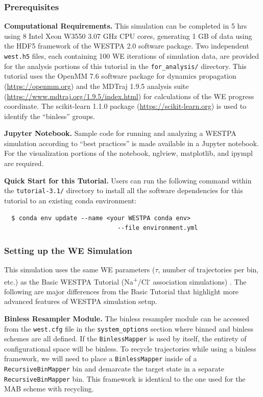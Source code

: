 \subsubsection{Prerequisites}

\textbf{Computational Requirements.} This simulation can be completed in 5 hrs using 8 Intel Xeon W3550 3.07 GHz CPU cores, generating 1 GB of data using the HDF5 framework of the WESTPA 2.0 software package. 
Two independent \verb|west.h5| files, each containing 100 WE iterations of simulation data, are provided for the analysis portions of this tutorial in the \verb|for_analysis/| directory.
This tutorial uses the OpenMM 7.6 software package for dynamics propagation ({\url{https://openmm.org}}) and the MDTraj 1.9.5 analysis suite ({\url{https://www.mdtraj.org/1.9.5/index.html}}) for calculations of the WE progress coordinate. 
The scikit-learn 1.1.0 package ({\url{https://scikit-learn.org}}) is used to identify the “binless” groups.

\textbf{Jupyter Notebook.} Sample code for running and analyzing a WESTPA simulation according to “best practices” is made available in a Jupyter notebook.
For the visualization portions of the notebook, nglview, matplotlib, and ipympl are required. 

\textbf{Quick Start for this Tutorial.} Users can run the following command within the \verb|tutorial-3.1/| directory to install all the software dependencies for this tutorial to an existing conda environment:
\begin{verbatim}
  $ conda env update --name <your WESTPA conda env> 
                               --file environment.yml
\end{verbatim}

\subsubsection{Setting up the WE Simulation}
This simulation uses the same WE parameters ($\tau$, number of trajectories per bin, etc.) as the Basic WESTPA Tutorial (Na\textsuperscript{+}/Cl\textsuperscript{-} association simulations) \citep{bogetti_suite_2019}. 
The following are major differences from the Basic Tutorial that highlight more advanced features of WESTPA simulation setup.

\textbf{Binless Resampler Module.} The binless resampler module can be accessed from the \verb|west.cfg| file in the \verb|system_options| section where binned and binless schemes are all defined. 
If the \verb|BinlessMapper| is used by itself, the entirety of configurational space will be binless. 
To recycle trajectories while using a binless framework, we will need to place a \verb|BinlessMapper| inside of a \verb|RecursiveBinMapper| bin and demarcate the target state in a separate \verb|RecursiveBinMapper| bin. 
This framework is identical to the one used for the MAB scheme with recycling.

